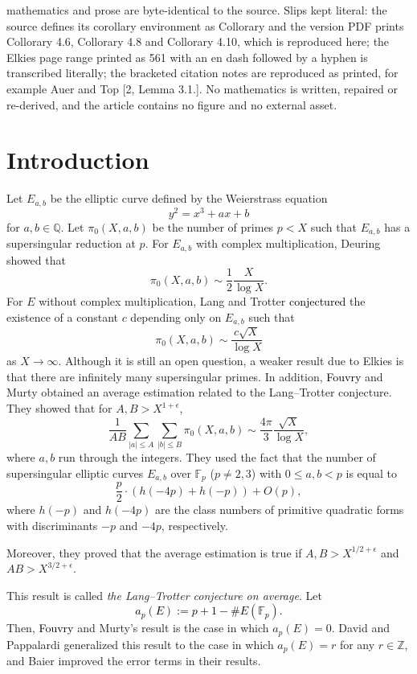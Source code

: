 \documentclass[10pt,a4paper]{amsart}
\theoremstyle{plain}
\newcommand{\fp}{\mathbb{F}_p}
\newcommand{\bQ}{\mathbb{Q}}
\newcommand{\bZ}{\mathbb{Z}}
\begin{document}
mathematics and prose are byte-identical to the source. Slips kept literal: the source defines its corollary environment as Collorary and the version PDF prints Collorary 4.6, Collorary 4.8 and Collorary 4.10, which is reproduced here; the Elkies page range printed as 561 with an en dash followed by a hyphen is transcribed literally; the bracketed citation notes are reproduced as printed, for example Auer and Top [2, Lemma 3.1.]. No mathematics is written, repaired or re-derived, and the article contains no figure and no external asset.

\section{Introduction}

Let $E_{a,b}$ be the elliptic curve defined by the Weierstrass equation 
\[
y^2=x^3+ax+b 
\]
for $a,b \in \bQ$. Let ${\pi}_0(X,a,b)$ be the number of primes $p<X$ such that $E_{a,b}$ has a supersingular reduction at $p$. For $E_{a,b}$ with complex multiplication, Deuring \cite{Deu} showed that 
\[
{\pi}_0(X,a,b) \sim \frac{1}{2} \frac{X}{\log X}.
\]
For $E$ without complex multiplication, Lang and Trotter \cite{LT} \textcolor{black}{conjectured} the existence of a constant $c$ depending only on $E_{a,b}$ such that
\[
{\pi}_0(X,a,b) \sim \frac{c \sqrt{X}}{\log X}
\]
as $X \rightarrow \infty$. Although it is still an open question, a weaker result due to Elkies \cite{Elkies} is that there are infinitely many supersingular primes. 
In addition, \textcolor{black}{Fouvry} and Murty obtained an average estimation related to the Lang--Trotter conjecture. They showed that for $A,B > X^{1+ \epsilon}$, 
\[
\frac{1}{AB} \sum_{\lvert a \rvert \le A} \sum_{\lvert b \rvert \le B} {\pi}_{0}(X,a,b) \sim \frac{4 \pi}{3} \frac{\sqrt{X}}{\log X},
\]
where $a,b$ run  through the integers. They used the fact that the number of supersingular elliptic curves $E_{a,b}$ over $\fp$ ($p \neq2,3$) with $0 \le a,b < p $ is equal to   
\[
\frac{p}{2} \cdot \left(h(-4p)+h(-p) \right)+O(p),
\]
where $h(-p)$ and $h(-4p)$ are the class numbers of primitive quadratic forms with discriminants $-p$ and $-4p$, respectively.

Moreover, they proved that the average estimation is true if $A,B > X^{1/2+ \epsilon}$ and $AB > X^{3/2 +\epsilon}$.

This result is called \textit{the Lang--Trotter conjecture on average}. 
Let \textcolor{black}{\[ a_p(E):=p+1-\#E(\fp).\]} Then, \textcolor{black}{Fouvry} and Murty's result is the case in which $a_p(E)=0$. David and Pappalardi \cite{DP} generalized this result to the case in which $a_p(E)=r$ for any $r \in \bZ$, and Baier \cite{SB} improved the error terms in their results.  
\end{document}
